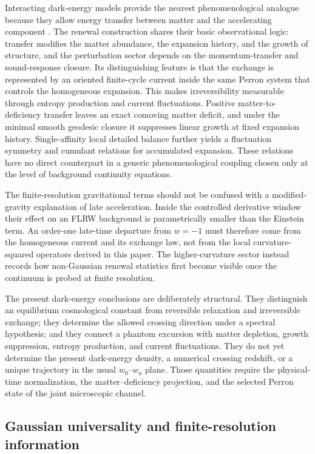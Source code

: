 \documentclass[11pt]{article}
\theoremstyle{definition}
\theoremstyle{remark}
\begin{document}
Interacting dark-energy models provide the nearest phenomenological analogue because they allow energy transfer between matter and the accelerating component \cite{Amendola2000,ValiviitaMajerottoMaartens,ClemsonEtAl}.  The renewal construction shares their basic observational logic: transfer modifies the matter abundance, the expansion history, and the growth of structure, and the perturbation sector depends on the momentum-transfer and sound-response closure.  Its distinguishing feature is that the exchange is represented by an oriented finite-cycle current inside the same Perron system that controls the homogeneous expansion.  This makes irreversibility measurable through entropy production and current fluctuations.  Positive matter-to-deficiency transfer leaves an exact comoving matter deficit, and under the minimal smooth geodesic closure it suppresses linear growth at fixed expansion history.  Single-affinity local detailed balance further yields a fluctuation symmetry and cumulant relations for accumulated expansion.  These relations have no direct counterpart in a generic phenomenological coupling chosen only at the level of background continuity equations.

The finite-resolution gravitational terms should not be confused with a modified-gravity explanation of late acceleration.  Inside the controlled derivative window their effect on an FLRW background is parametrically smaller than the Einstein term.  An order-one late-time departure from $w=-1$ must therefore come from the homogeneous current and its exchange law, not from the local curvature-squared operators derived in this paper.  The higher-curvature sector instead records how non-Gaussian renewal statistics first become visible once the continuum is probed at finite resolution.

The present dark-energy conclusions are deliberately structural.  They distinguish an equilibrium cosmological constant from reversible relaxation and irreversible exchange; they determine the allowed crossing direction under a spectral hypothesis; and they connect a phantom excursion with matter depletion, growth suppression, entropy production, and current fluctuations.  They do not yet determine the present dark-energy density, a numerical crossing redshift, or a unique trajectory in the usual $w_0$--$w_a$ plane.  Those quantities require the physical-time normalization, the matter--deficiency projection, and the selected Perron state of the joint microscopic channel.

\subsection{Gaussian universality and finite-resolution information}
\end{document}

